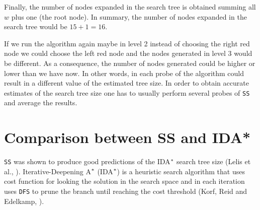Finally, the number of nodes expanded in the search tree is obtained summing all $w$ plus one (the root node). In summary, the number of nodes expanded in the search tree would be $ 15 + 1 = 16$. 

If we run the algorithm again maybe in level 2 instead of choosing the right red node we could choose the left red node and the nodes generated in level 3 would be different. As a consequence, the number of nodes generated could be higher or lower than we have now. In other words, in each probe of the algorithm could result in a different value of the estimated tree size. In order to obtain accurate estimates of the search tree size one has to usually perform several probes of \texttt{SS} and average the results.

\section{Comparison between SS and IDA*}
\noindent
\texttt{SS} was shown to produce good predictions of the IDA$\sp{*}$ search tree size (Lelis et al., \citeyear{lelis2013predicting}). Iterative-Deepening A$\sp{*}$ (IDA$\sp{*}$) is a heuristic search algorithm that uses cost function for looking the solution in the search space and in each iteration uses \texttt{DFS} to prune the branch until reaching the cost threshold (Korf, Reid and Edelkamp, \citeyear{korf2001timecomplexity}).
 
